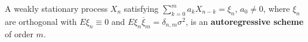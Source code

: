 A weakly stationary process $X_n$ satisfying $\sum_{k=0}^m a_k X_{n-k} = \xi_n$, $a_0 \neq 0$, where $\xi_n$ are orthogonal with $E\xi_n \equiv 0$ and $E\xi_n \overline{\xi}_m = \delta_{n,m} \sigma^2$, is an \textbf{autoregressive scheme} of order $m$.
